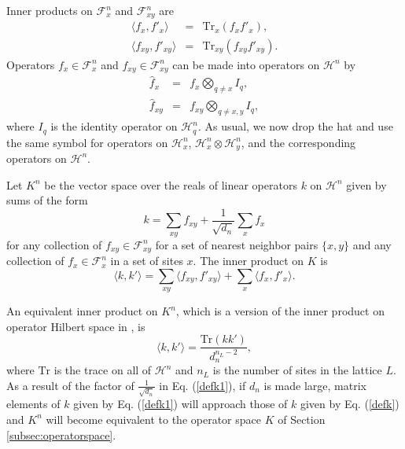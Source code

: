 \documentclass[twocolumn,amsmath,amssymb]{revtex4-1}
\begin{document}
Inner products on $\mathcal{F}^n_x$ and $\mathcal{F}^n_{xy}$ are
\begin{subequations}
\begin{eqnarray}
  \label{ffprime1}
   \langle  f_x, f'_x \rangle  &=& \mathrm{Tr}_x( f_x f'_x), \\
  \label{ffprime2}
   \langle  f_{xy}, f'_{xy} \rangle  &=& \mathrm{Tr}_{xy}( f_{xy} f'_{xy}).
\end{eqnarray}
\end{subequations}
Operators $f_x \in \mathcal{F}^n_x$ and $f_{xy} \in \mathcal{F}^n_{xy}$ can be made into
operators on $\mathcal{H}^n$ by
\begin{subequations}
\begin{eqnarray}
\label{defhf1}
\hat{ f}_x &=&  f_x \bigotimes_{q \ne x} I_q, \\
\label{defhf2}
\hat{ f}_{xy} &=&  f_{xy} \bigotimes_{q \ne x,y} I_q, 
\end{eqnarray}
\end{subequations}
where $I_q$ is the identity operator on $\mathcal{H}^n_q$.
As usual, we now drop the hat and use the same symbol for operators  
on $\mathcal{H}^n_x$,
$\mathcal{H}^n_x \otimes \mathcal{H}^n_y$,
and the corresponding operators on $\mathcal{H}^n$.

Let $K^n$ be the vector space over the
reals of linear operators $k$ on $\mathcal{H}^n$ given by sums of the form
\begin{equation}
\label{defk1}
k = \sum_{x y} f_{x y} + \frac{1}{\sqrt{d_n}} \sum_x f_x
\end{equation}
for any collection of 
$f_{x y} \in \mathcal{F}^n_{x y}$ for a set of nearest neighbor pairs $\{x, y\}$
and any collection of $f_x \in \mathcal{F}^n_x$ in a set of sites $x$.
The inner product on $K$ is
\begin{equation}
\label{defkkprime1}
 \langle  k, k' \rangle   =  \sum_{xy}  \langle  f_{xy}, f'_{xy} \rangle  + \sum_x  \langle  f_x, f'_x \rangle .
\end{equation}

An equivalent inner product on $K^n$, which is a version of the
inner product on operator Hilbert space in \cite{Nielsen}, is 
\begin{equation}
  \label{defggprime}
   \langle  k, k' \rangle  = \frac{ \mathrm{Tr}( k k')}{ d_n^{n_L - 2}},
\end{equation}
where $\mathrm{Tr}$ is the trace on all of $\mathcal{H}^n$ and $n_L$
is the number of sites in the lattice $L$.
As a result of the factor of $\frac{1}{\sqrt{d_n}}$ in Eq. (\ref{defk1}),
if $d_n$ is made large, matrix elements of $k$ given by
Eq. (\ref{defk1}) will approach those of $k$ given
by Eq. (\ref{defk}) and  $K^n$ will become equivalent to
the operator space $K$ of Section \ref{subsec:operatorspace}.
\end{document}
